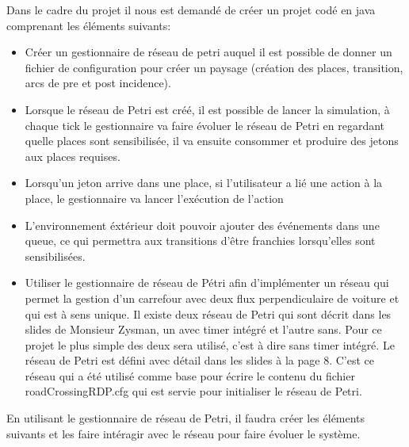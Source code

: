\documentclass[11pt,a4paper, openany]{memoir}
\begin{document}
Dans le cadre du projet il nous est demandé de créer un projet codé en java comprenant les éléments suivants:
\begin{itemize}
\item Créer un gestionnaire de réseau de petri auquel il est possible de donner un fichier de configuration pour créer un paysage (création des places, transition, arcs de pre et post incidence).
\item Lorsque le réseau de Petri est créé, il est possible de lancer la simulation, à chaque tick le gestionnaire va faire évoluer le réseau de Petri en regardant quelle places sont sensibilisée, il va ensuite consommer et produire des jetons aux places requises.
\item Lorsqu'un jeton arrive dans une place, si l'utilisateur a lié une action à la place, le gestionnaire va lancer l'exécution de l'action
\item L'environnement éxtérieur doit pouvoir ajouter des événements dans une queue, ce qui permettra aux transitions d'être franchies lorsqu'elles sont sensibilisées.
\item Utiliser le gestionnaire de réseau de Pétri afin d'implémenter un réseau qui permet la gestion d'un carrefour avec deux flux perpendiculaire de voiture et qui est à sens unique. Il existe deux réseau de Petri qui sont décrit dans les slides de Monsieur Zysman, un avec timer intégré et l'autre sans. Pour ce projet le plus simple des deux sera utilisé, c'est à dire sans timer intégré. Le réseau de Petri est défini avec détail dans les slides à la page 8. C'est ce réseau qui a été utilisé comme base pour écrire le contenu du fichier roadCrossingRDP.cfg qui est servie pour initialiser le réseau de Petri.\\
\end{itemize}
En utilisant le gestionnaire de réseau de Petri, il faudra créer les éléments suivants et les faire intéragir avec le réseau pour faire évoluer le système.
\end{document}
